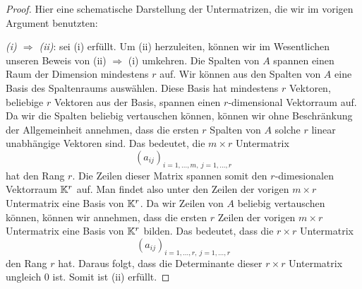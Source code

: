\begin{proof}
	Hier eine schematische Darstellung der Untermatrizen, die wir im vorigen Argument benutzten: 
	\begin{center}	
	\end{center}

	\emph{(i) $\Rightarrow$ (ii)}: sei (i) erfüllt. Um (ii) herzuleiten, können wir im Wesentlichen unseren Beweis von (ii) $\Rightarrow$ (i) umkehren. Die Spalten von $A$ spannen einen Raum der Dimension mindestens $r$ auf. Wir können aus den Spalten von $A$ eine Basis des Spaltenraums auswählen. Diese Basis hat mindestens $r$ Vektoren, beliebige $r$ Vektoren aus der Basis, spannen einen $r$-dimensional Vektorraum auf. Da wir die Spalten beliebig vertauschen können, können wir ohne Beschränkung der Allgemeinheit annehmen, dass die ersten $r$ Spalten von $A$ solche $r$ linear unabhängige Vektoren sind. Das bedeutet, die $m \times r$ Untermatrix
	\[
		(a_{ij})_{i=1,\ldots,m, \ j=1,\ldots,r}
	\]
	hat den Rang $r$. Die Zeilen dieser Matrix spannen somit den $r$-dimesionalen Vektorraum  $\mathbb K^r$ auf. Man findet also unter den Zeilen der vorigen $m \times r$ Untermatrix eine Basis von $\mathbb K^r$. Da wir Zeilen von $A$ beliebig vertauschen können, können wir annehmen, dass die ersten $r$ Zeilen der vorigen $m \times r$ Untermatrix eine Basis von $\mathbb K^r$ bilden. Das bedeutet, dass die $r \times r$ Untermatrix 
	\[
		(a_{ij})_{i=1,\ldots,r, \ j=1,\ldots,r}
	\]
	den Rang $r$ hat. Daraus folgt, dass die Determinante dieser $r \times r$ Untermatrix ungleich $0$ ist. Somit ist (ii) erfüllt. 
\end{proof}

